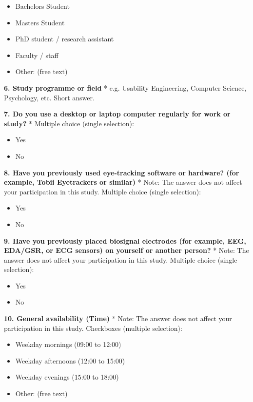 \documentclass[
]{article}
\begin{document}
\begin{itemize}
\item
  Bachelor\textquotesingle s Student
\item
  Master\textquotesingle s Student
\item
  PhD student / research assistant
\item
  Faculty / staff
\item
  Other: (free text)
\end{itemize}

\textbf{6. Study programme or field} * e.g. Usability Engineering, Computer Science, Psychology, etc. Short answer.

\textbf{7. Do you use a desktop or laptop computer regularly for work or study?} * Multiple choice (single selection):

\begin{itemize}
\item
  Yes
\item
  No
\end{itemize}

\textbf{8. Have you previously used eye-tracking software or hardware? (for example, Tobii Eyetrackers or similar)} * Note: The answer does not affect your participation in this study. Multiple choice (single selection):

\begin{itemize}
\item
  Yes
\item
  No
\end{itemize}

\textbf{9. Have you previously placed biosignal electrodes (for example, EEG, EDA/GSR, or ECG sensors) on yourself or another person?} * Note: The answer does not affect your participation in this study. Multiple choice (single selection):

\begin{itemize}
\item
  Yes
\item
  No
\end{itemize}

\textbf{10. General availability (Time)} * Note: The answer does not affect your participation in this study. Checkboxes (multiple selection):

\begin{itemize}
\item
  Weekday mornings (09:00 to 12:00)
\item
  Weekday afternoons (12:00 to 15:00)
\item
  Weekday evenings (15:00 to 18:00)
\item
  Other: (free text)
\end{itemize}
\end{document}
